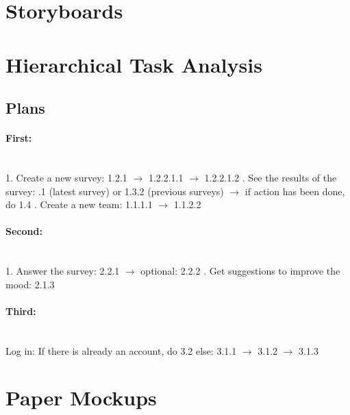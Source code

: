 \documentclass[11pt]{report}
\begin{document}
\section{Storyboards}



\section{Hierarchical Task Analysis}

\subsection{Plans}

\paragraph{First:}\mbox{}\\
1. Create a new survey:
1.2.1 $\rightarrow$ 1.2.2.1.1 $\rightarrow$ 1.2.2.1.2
\vspace*{3mm}
\newline
{}. See the results of the survey:
.1 (latest survey) or 1.3.2 (previous surveys)
\newline
$\rightarrow$ if action has been done, do 1.4
\vspace*{3mm}
\newline
{}. Create a new team: 1.1.1.1 $\rightarrow$ 1.1.2.2 
 
\paragraph{Second:}\mbox{}\\
1. Answer the survey: 2.2.1 $\rightarrow$ optional: 2.2.2
\newline
{}. Get suggestions to improve the mood: 2.1.3

\paragraph{Third:}\mbox{}\\
Log in: If there is already an account, do 3.2
\newline
\hspace*{12mm} else: 3.1.1 $\rightarrow$ 3.1.2 $\rightarrow$ 3.1.3

\section{Paper Mockups}
\end{document}
